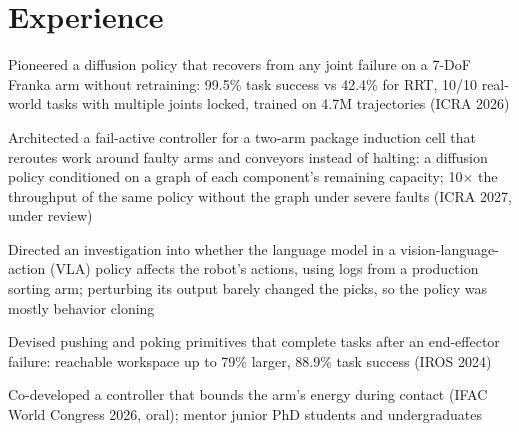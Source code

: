 \documentclass[]{deedy-resume-openfont}
\renewcommand{\sectionsep}{\vspace{3pt}}
\begin{document}
\begin{minipage}[t]{0.66\textwidth}

\section{Experience}

\vspace{0.25cm}  %
\begin{tightemize}
\item Pioneered a diffusion policy that recovers from any joint failure on a 7-DoF Franka arm without retraining: 99.5\% task success vs 42.4\% for RRT, 10/10 real-world tasks with multiple joints locked, trained on 4.7M trajectories (ICRA 2026)
\item Architected a fail-active controller for a two-arm package induction cell that reroutes work around faulty arms and conveyors instead of halting: a diffusion policy conditioned on a graph of each component's remaining capacity; 10$\times$ the throughput of the same policy without the graph under severe faults (ICRA 2027, under review)
\item Directed an investigation into whether the language model in a vision-language-action (VLA) policy affects the robot's actions, using logs from a production sorting arm; perturbing its output barely changed the picks, so the policy was mostly behavior cloning
\item Devised pushing and poking primitives that complete tasks after an end-effector failure: reachable workspace up to 79\% larger, 88.9\% task success (IROS 2024)
\item Co-developed a controller that bounds the arm's energy during contact (IFAC World Congress 2026, oral); mentor junior PhD students and undergraduates
\end{tightemize}
\sectionsep


\end{minipage}
\end{document}
